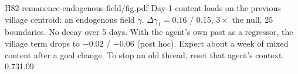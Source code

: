 {H82-remanence-endogenous-field/fig.pdf}
{Day-1 content loads on the previous village centroid: an endogenous field $\gamma$.}
{$\Delta\gamma_1=0.16$ / 0.15, $3\times$ the null, 25 boundaries. No decay over 5 days. With the agent's own past as a regressor, the village term drops to $-0.02$ / $-0.06$ (post hoc).}
{Expect about a week of mixed content after a goal change. To stop an old thread, reset that agent's context.}
{0.73}{1.09}
